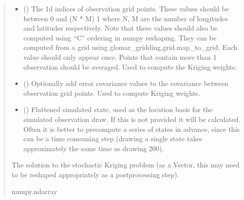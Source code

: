 \documentclass[letterpaper,10pt,english]{sphinxmanual}
\begin{document}
\begin{fulllineitems}
\begin{fulllineitems}
\begin{quote}
\begin{description}
\begin{itemize}
\item {}
\sphinxAtStartPar
{} () \textendash{} The 1d indices of observation grid points. These values should be
between 0 and (N * M) \sphinxhyphen{} 1 where N, M are the number of longitudes
and latitudes respectively. Note that these values should also be
computed using “C” ordering in numpy reshaping. They can be
computed from a grid using glomar\_gridding.grid.map\_to\_grid. Each
value should only appear once. Points that contain more than 1
observation should be averaged. Used to compute the Kriging weights.

\item {}
\sphinxAtStartPar
{} (\sphinxstyleliteralemphasis{\sphinxupquote{ | }}) \textendash{} Optionally add error covariance values to the covariance between
observation grid points. Used to compute Kriging weights.

\item {}
\sphinxAtStartPar
{} (\sphinxstyleliteralemphasis{\sphinxupquote{ | }}) \textendash{} Flattened simulated state, used as the location basis for the
simulated observation draw. If this is not provided it will be
calculated. Often it is better to pre\sphinxhyphen{}compute a series of states in
advance, since this can be a time consuming step (drawing a single
state takes approximately the same time as drawing 200).

\end{itemize}

\sphinxAtStartPar
The solution to the stochastic Kriging problem (as a Vector, this
may need to be re\sphinxhyphen{}shaped appropriately as a post\sphinxhyphen{}processing step).

\sphinxAtStartPar
numpy.ndarray

\end{description}\end{quote}

\end{fulllineitems}


\end{fulllineitems}
\end{document}
